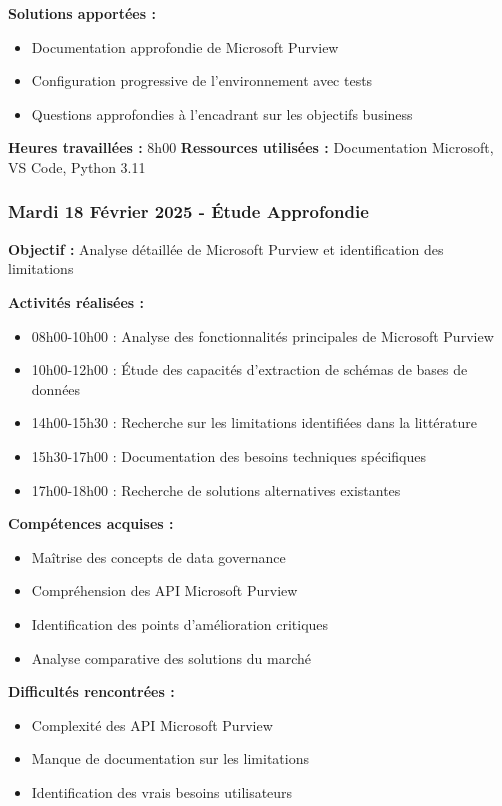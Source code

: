 \textbf{Solutions apportées :}
\begin{itemize}
    \item Documentation approfondie de Microsoft Purview
    \item Configuration progressive de l'environnement avec tests
    \item Questions approfondies à l'encadrant sur les objectifs business
\end{itemize}

\textbf{Heures travaillées :} 8h00
\textbf{Ressources utilisées :} Documentation Microsoft, VS Code, Python 3.11

\subsubsection{Mardi 18 Février 2025 - Étude Approfondie}
\textbf{Objectif :} Analyse détaillée de Microsoft Purview et identification des limitations

\textbf{Activités réalisées :}
\begin{itemize}
    \item 08h00-10h00 : Analyse des fonctionnalités principales de Microsoft Purview
    \item 10h00-12h00 : Étude des capacités d'extraction de schémas de bases de données
    \item 14h00-15h30 : Recherche sur les limitations identifiées dans la littérature
    \item 15h30-17h00 : Documentation des besoins techniques spécifiques
    \item 17h00-18h00 : Recherche de solutions alternatives existantes
\end{itemize}

\textbf{Compétences acquises :}
\begin{itemize}
    \item Maîtrise des concepts de data governance
    \item Compréhension des API Microsoft Purview
    \item Identification des points d'amélioration critiques
    \item Analyse comparative des solutions du marché
\end{itemize}

\textbf{Difficultés rencontrées :}
\begin{itemize}
    \item Complexité des API Microsoft Purview
    \item Manque de documentation sur les limitations
    \item Identification des vrais besoins utilisateurs
\end{itemize}

